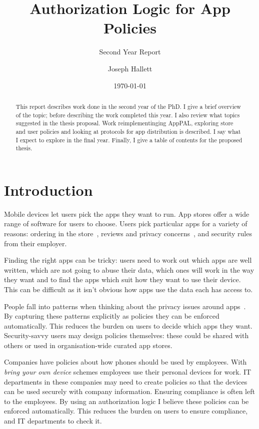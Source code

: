 \documentclass[a4paper]{scrartcl}
\title{Authorization Logic for App Policies}
\subtitle{Second Year Report}
\author{Joseph Hallett}
\date\today
\begin{document}
\maketitle

\begin{abstract}
  This report describes work done in the second year of the PhD.
  I give a brief overview of the topic; before describing the work completed this year.
  I also review what topics suggested in the thesis proposal.
  Work reimplementinging AppPAL, exploring store and user policies and looking at protocols for app distribution is described.
  I say what I expect to explore in the final year.
  Finally, I give a table of contents for the proposed thesis.
\end{abstract}

\section{Introduction}

Mobile devices let users pick the apps they want to run.
App stores offer a wide range of software for users to choose.
Users pick particular apps for a variety of reasons:
  ordering in the store~\citep{Prata:2012in},
  reviews and privacy concerns~\citep{Kelley:2013kc},
  and security rules from their employer.

Finding the right apps can be tricky:
  users need to work out which apps are well written, which are not going to abuse their data, which ones will work in the way they want
  and to find the apps which suit how they want to use their device.
This can be difficult as it isn't obvious how apps use the data each has access to.

People fall into patterns when thinking about the privacy issues around apps~\citep{Sadeh:2014vq}.
By capturing these patterns explicitly as policies they can be enforced automatically.
This reduces the burden on users to decide which apps they want.
Security-savvy users may design policies themselves: these could be shared with others or used in organisation-wide curated app stores.

Companies have policies about how phones should be used by employees.
With \emph{bring your own device} schemes employees use their personal devices for work.
IT departments in these companies may need to create policies so that the devices can be used securely with company information.
Ensuring compliance is often left to the employees.
By using an authorization logic I believe these policies can be enforced automatically.
This reduces the burden on users to ensure compliance, and IT departments to check it.
\end{document}
